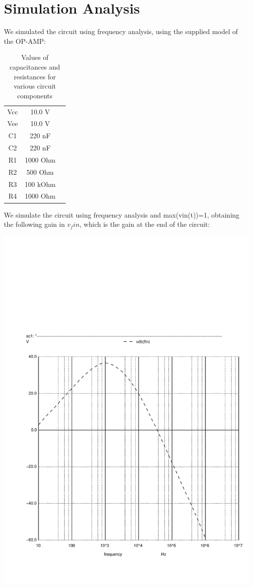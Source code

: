 \section{Simulation Analysis}
\label{sec:simulation}

We simulated the circuit using frequency analysis, using the supplied model of the OP-AMP:

\begin{table}[H]
\addtolength{\tabcolsep}{-4pt}
\caption{Values of capacitances and resistances for various circuit components}
\vspace{-3mm}
\begin{tabular}{|c|c|c|}
\hline
Vcc & 10.0 V\\
Vee & 10.0 V\\
C1 & 220 nF\\
C2 & 220 nF\\
R1 & 1000 Ohm\\
R2 & 500 Ohm\\
R3 & 100 kOhm\\
R4 & 1000 Ohm\\
\hline
\end{tabular}
\label{tab:Components}
\end{table}

\par

We simulate the circuit using frequency analysis and max(vin(t))=1, obtaining the following gain in $v_fin$, which is the gain at the end of the circuit:

\includegraphics[width=0.8\linewidth]{../sim/vo1f.pdf}


